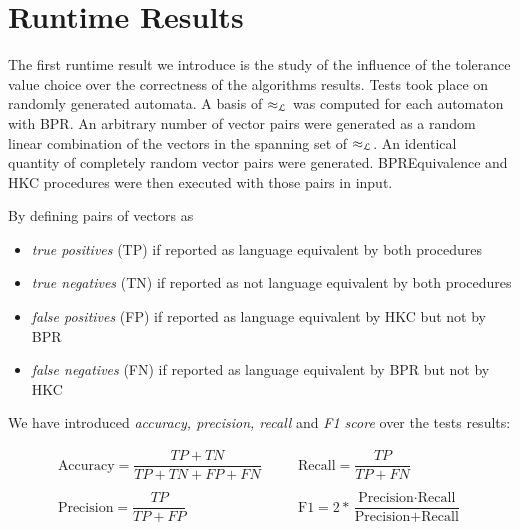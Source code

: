 \section{Runtime Results}


The first runtime result we introduce is the study of the influence 
of the tolerance value choice over the correctness of the algorithms results.
Tests took place on randomly generated automata. A basis of  $\approx_{\mathcal{L}}$ was 
computed for each automaton with BPR. An arbitrary number of vector pairs were generated 
as a random linear combination of the vectors in the spanning set of $\approx_{\mathcal{L}}$. 
An identical quantity of completely random vector pairs were generated.
BPREquivalence and HKC procedures were then executed with those pairs in input.

By defining pairs of vectors as 

\begin{itemize}
    \item \textit{true positives} (TP) if reported as language equivalent by both 
    procedures
    \item \textit{true negatives} (TN) if reported as not language equivalent by both 
    procedures
    \item \textit{false positives} (FP) if reported as language equivalent by HKC but not by BPR
    \item \textit{false negatives} (FN) if reported as  language equivalent by BPR but not by HKC
\end{itemize}


We have introduced \textit{accuracy, precision, recall} and \textit{F1 score} over 
the tests results: 

\begin{equation*}
    \begin{aligned}
        \text{Accuracy} = \dfrac{TP + TN}{TP + TN + FP + FN} & \quad & 
        \text{Recall} = \dfrac{TP}{TP + FN} \\ && \\
        \text{Precision} = \dfrac{TP}{TP + FP} & \quad &
        \text{F1} = 2 * \dfrac{\text{Precision} \cdot \text{Recall}}{\text{Precision} + \text{Recall}}  \\ && \\
    \end{aligned}
\end{equation*}

